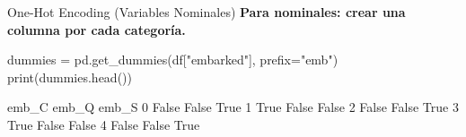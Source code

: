 \documentclass[aspectratio=169, 11pt]{beamer}
\begin{document}
\begin{frame}[fragile,shrink=28]{One-Hot Encoding (Variables Nominales)}
  \vspace{-6pt}
  {\footnotesize\color{arcaDark}\bfseries
    Para nominales: crear una columna por cada categoría.}

  \vspace{4pt}
  \begin{pyblock}
dummies = pd.get_dummies(df["embarked"], prefix="emb")
print(dummies.head())
  \end{pyblock}

  \vspace{4pt}
  \begin{outputblock}
   emb_C  emb_Q  emb_S
0  False  False   True
1   True  False  False
2  False  False   True
3   True  False  False
4  False  False   True
  \end{outputblock}
\end{frame}
\end{document}
